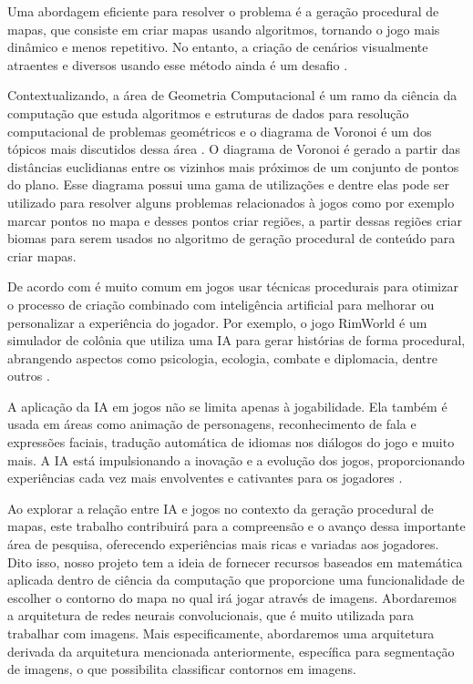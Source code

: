 Uma abordagem eficiente para resolver o problema é a geração procedural de mapas, que consiste em criar mapas usando algoritmos, tornando o jogo mais dinâmico e menos repetitivo. No entanto, a criação de cenários visualmente atraentes e diversos usando esse método ainda é um desafio \cite{geracao_procedural_jogos_2d}.

Contextualizando, a área de Geometria Computacional é um ramo da ciência da computação que estuda algoritmos e estruturas de dados para resolução computacional de problemas geométricos e o diagrama de Voronoi é um dos tópicos mais discutidos dessa 
área \cite{diagrama_voronoi_jogos}. O diagrama de Voronoi é gerado a partir das distâncias euclidianas entre os vizinhos mais próximos de um conjunto de pontos do plano\space\cite{diagrama_de_voronoi:_uma_exploracao_nas_distancias_euclidiana_e_do_taxi}. Esse diagrama possui uma gama de utilizações e dentre elas pode ser utilizado para resolver alguns problemas relacionados à jogos como por exemplo marcar pontos no mapa e desses pontos criar regiões, a partir dessas regiões criar biomas para serem usados no algoritmo de geração procedural de conteúdo para criar mapas.

De acordo com  é muito comum em jogos usar técnicas procedurais para otimizar o processo de criação combinado com inteligência artificial para melhorar ou personalizar a experiência do jogador. Por exemplo, o jogo RimWorld é um simulador de colônia que utiliza uma IA para gerar histórias de forma procedural, abrangendo aspectos como psicologia, ecologia, combate e diplomacia, dentre outros \cite{jogo_procedural}.

A aplicação da IA em jogos não se limita apenas à jogabilidade. Ela também é usada em áreas como animação de personagens, reconhecimento de fala e expressões faciais, tradução automática de idiomas nos diálogos do jogo e muito mais. A IA está impulsionando a inovação e a evolução dos jogos, proporcionando experiências cada vez mais envolventes e cativantes para os jogadores \cite{exameNvidia, omniverseace}.

Ao explorar a relação entre IA e jogos no contexto da geração procedural de mapas, este trabalho contribuirá para a compreensão e o avanço dessa importante área de pesquisa, oferecendo experiências mais ricas e variadas aos jogadores. Dito isso, nosso projeto tem a ideia de fornecer recursos baseados em matemática aplicada dentro de ciência da computação que proporcione uma funcionalidade de escolher o contorno do mapa no qual irá jogar através de imagens. Abordaremos a arquitetura de redes neurais convolucionais, que é muito utilizada para trabalhar com imagens. Mais especificamente, abordaremos uma arquitetura derivada da arquitetura mencionada anteriormente, específica para segmentação de imagens, o que possibilita classificar contornos em imagens.

